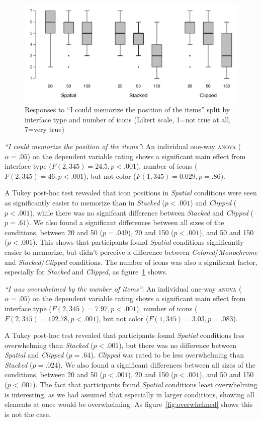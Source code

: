 \documentclass[nobib]{tufte-book} %
\begin{document}
\begin{figure}
  \includegraphics{postcon-memorize.pdf}
  \caption{Responses to ``I could memorize the position of the items'' split by interface type and number of icons (Likert scale, 1=not true at all, 7=very true)}
  \label{fig:memorize}
\end{figure}

\emph{``I could memorize the position of the items''}:
An individual one-way \textsc{anova} ($\alpha = .05$) on the dependent variable rating shows a significant main effect from interface type ($F(2,345) = 24.5, p < .001$), number of icons ($F(2,345) = 46, p < .001$), but not color ($F(1,345) = 0.029, p = .86$).

A Tukey post-hoc test revealed that icon positions in \emph{Spatial} conditions were seen as significantly easier to memorize than in \emph{Stacked} ($p < .001$) and \emph{Clipped} ($p < .001$), while there was no signifcant difference between \emph{Stacked} and \emph{Clipped} ($p = .61$). We also found a significant differences between all sizes of the conditions, between 20 and 50 ($p = .049$), 20 and 150 ($p < .001$), and 50 and 150 ($p < .001$). This shows that participants found \emph{Spatial} conditions significantly easier to memorize, but didn't perceive a difference between \emph{Colored}/\emph{Monochrome} and \emph{Stacked}/\emph{Clipped} conditions. The number of icons was also a significant factor, especially for \emph{Stacked} and \emph{Clipped}, as figure~\ref{fig:memorize} shows.

\emph{``I was overwhelmed by the number of items''}:
An individual one-way \textsc{anova} ($\alpha = .05$) on the dependent variable rating shows a significant main effect from interface type ($F(2,345) = 7.97, p < .001$), number of icons ($F(2,345) = 192.78, p < .001$), but not color ($F(1,345) = 3.03, p = .083$).

A Tukey post-hoc test revealed that participants found \emph{Spatial} conditions less overwhelming than \emph{Stacked} ($p < .001$), but there was no difference between \emph{Spatial} and \emph{Clipped} ($p = .64$). \emph{Clipped} was rated to be less overwhelming than \emph{Stacked} ($p = .024$). We also found a significant differences between all sizes of the conditions, between 20 and 50 ($p < .001$), 20 and 150 ($p < .001$), and 50 and 150 ($p < .001$). The fact that participants found \emph{Spatial} conditions least overwhelming is interesting, as we had assumed that especially in larger conditions, showing all elements at once would be overwhelming. As figure~\ref{fig:overwhelmed} shows this is not the case.
\end{document}
